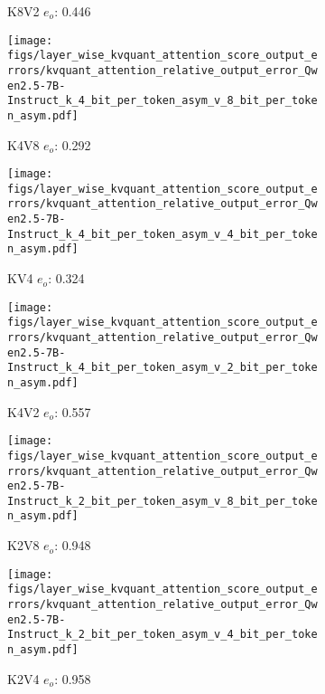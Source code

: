 \begin{figure}
\begin{subfigure}{0.25\columnwidth}
    \caption{K8V2 $e_o$: 0.446}
    \label{fig:kvcache_simulated_quant_error_layer_wise_k8v2_per_token_asym_Qwen2.5-7B-Instruct}
    \end{subfigure}
    \begin{subfigure}{0.25\columnwidth}
    \texttt{[image: figs/layer\_wise\_kvquant\_attention\_score\_output\_errors/kvquant\_attention\_relative\_output\_error\_Qwen2.5-7B-Instruct\_k\_4\_bit\_per\_token\_asym\_v\_8\_bit\_per\_token\_asym.pdf]}
    \caption{K4V8 $e_o$: 0.292}
    \label{fig:kvcache_simulated_quant_error_layer_wise_k4v8_per_token_asym_Qwen2.5-7B-Instruct}
    \end{subfigure}
    \begin{subfigure}{0.25\columnwidth}
    \texttt{[image: figs/layer\_wise\_kvquant\_attention\_score\_output\_errors/kvquant\_attention\_relative\_output\_error\_Qwen2.5-7B-Instruct\_k\_4\_bit\_per\_token\_asym\_v\_4\_bit\_per\_token\_asym.pdf]}
    \caption{KV4 $e_o$: 0.324 }
    \label{fig:kvcache_simulated_quant_error_layer_wise_k4v4_per_token_asym_Qwen2.5-7B-Instruct}
    \end{subfigure}
    \begin{subfigure}{0.25\columnwidth}
    \texttt{[image: figs/layer\_wise\_kvquant\_attention\_score\_output\_errors/kvquant\_attention\_relative\_output\_error\_Qwen2.5-7B-Instruct\_k\_4\_bit\_per\_token\_asym\_v\_2\_bit\_per\_token\_asym.pdf]}
    \caption{K4V2 $e_o$: 0.557}
    \label{fig:kvcache_simulated_quant_error_layer_wise_k4v2_per_token_asym_Qwen2.5-7B-Instruct}
    \end{subfigure}
    \begin{subfigure}{0.25\columnwidth}
    \texttt{[image: figs/layer\_wise\_kvquant\_attention\_score\_output\_errors/kvquant\_attention\_relative\_output\_error\_Qwen2.5-7B-Instruct\_k\_2\_bit\_per\_token\_asym\_v\_8\_bit\_per\_token\_asym.pdf]}
    \caption{K2V8 $e_o$: 0.948}
    \label{fig:kvcache_simulated_quant_error_layer_wise_k2v8_per_token_asym_Qwen2.5-7B-Instruct}
    \end{subfigure}
    \begin{subfigure}{0.25\columnwidth}
    \texttt{[image: figs/layer\_wise\_kvquant\_attention\_score\_output\_errors/kvquant\_attention\_relative\_output\_error\_Qwen2.5-7B-Instruct\_k\_2\_bit\_per\_token\_asym\_v\_4\_bit\_per\_token\_asym.pdf]}
    \caption{K2V4 $e_o$: 0.958 }
    \label{fig:kvcache_simulated_quant_error_layer_wise_k2v4_per_token_asym_Qwen2.5-7B-Instruct}
    \end{subfigure}
    \begin{subfigure}{0.25\columnwidth}

\end{subfigure}
\end{figure}
